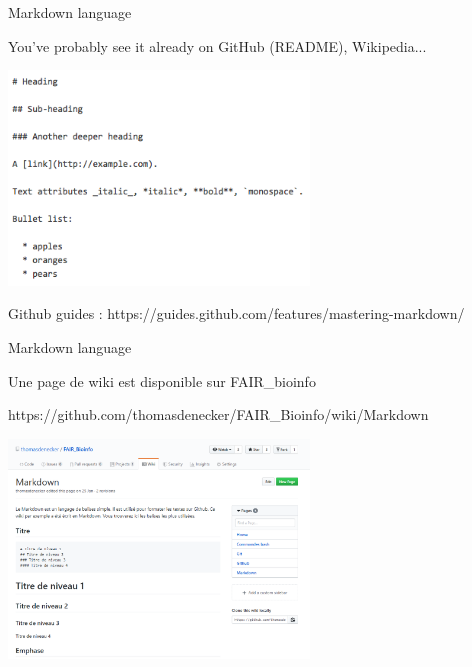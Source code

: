 \begin{frame}{Markdown language}

You've probably see it already on GitHub (README), Wikipedia... 

\centering\includegraphics[width=8cm]{07_notebook/images/markdown.png}

Github guides : https://guides.github.com/features/mastering-markdown/
\end{frame}


\begin{frame}{Markdown language}

Une page de wiki est disponible sur FAIR\_bioinfo

https://github.com/thomasdenecker/FAIR\_Bioinfo/wiki/Markdown

\centering\includegraphics[width=8cm]{07_notebook/images/markdown_github_FAIR_bioinfo.png}

\end{frame}

